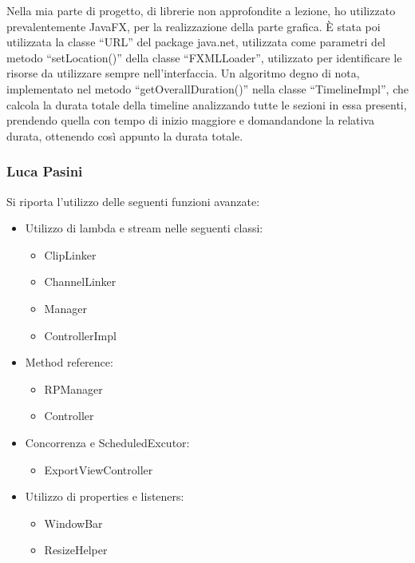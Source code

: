 \documentclass[a4paper,12pt]{report}
\begin{document}
Nella mia parte di progetto, di librerie non approfondite a lezione, ho utilizzato prevalentemente JavaFX, per la realizzazione della parte grafica. È stata poi utilizzata la classe “URL” del package java.net, utilizzata come parametri del metodo “setLocation()” della classe “FXMLLoader”, utilizzato per identificare le risorse da utilizzare sempre nell’interfaccia.
Un algoritmo degno di nota, implementato nel metodo “getOverallDuration()” nella classe “TimelineImpl”, che calcola la durata totale della timeline analizzando tutte le sezioni in essa presenti, prendendo quella con tempo di inizio maggiore e domandandone la relativa durata, ottenendo così appunto la durata totale.

\subsubsection{Luca Pasini}
Si riporta l’utilizzo delle seguenti funzioni avanzate:
\begin{itemize}
    \item Utilizzo di lambda e stream nelle seguenti classi:
    \begin{itemize}
        \item ClipLinker
        \item ChannelLinker
        \item Manager
        \item ControllerImpl
    \end{itemize}
    \item Method reference:
    \begin{itemize}
        \item RPManager
        \item Controller
    \end{itemize}
    \item Concorrenza e ScheduledExcutor:
    \begin{itemize}
        \item ExportViewController
    \end{itemize}
    \item Utilizzo di properties e listeners:
    \begin{itemize}
        \item WindowBar
        \item ResizeHelper
    \end{itemize}
\end{itemize}
\end{document}
